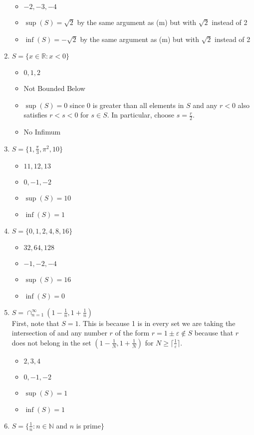 \documentclass[10pt,a4paper]{article}
\theoremstyle{definition}
\begin{document}
\begin{enumerate}[label = (\alph*)]
\begin{itemize}
\item $-2, -3, -4$
\item $\sup(S) = \sqrt{2}$ by the same argument as (m) but with $\sqrt{2}$ instead of 2
\item $\inf(S) = -\sqrt{2}$ by the same argument as (m) but with $\sqrt{2}$ instead of 2
\end{itemize}
\item $S = \{x \in \mathbb{R} : x < 0\}$
\begin{itemize}
\item $0, 1, 2$
\item Not Bounded Below
\item $\sup(S) = 0$ since 0 is greater than all elements in $S$ and any $r < 0$ also satisfies $r < s < 0$ for $s \in S$. In particular, choose $s = \frac{r}{2}$.
\item No Infimum
\end{itemize}
\item $S = \{1, \frac{\pi}{3}, \pi^2, 10\}$
\begin{itemize}
\item $11, 12, 13$
\item $0, -1, -2$
\item $\sup(S) = 10$
\item $\inf(S) = 1$
\end{itemize}
\item $S = \{0, 1, 2, 4, 8, 16\}$
\begin{itemize}
\item $32, 64, 128$
\item $-1, -2, -4$
\item $\sup(S) = 16$
\item $\inf(S) = 0$
\end{itemize}
\item $S = \cap_{n = 1}^{\infty} (1 - \frac{1}{n}, 1 + \frac{1}{n})$
\\First, note that $S = {1}$. This is because 1 is in every set we are taking the intersection of and any number $r$ of the form $r = 1 \pm \varepsilon \not\in S$ because that $r$ does not belong in the set $(1 - \frac{1}{N}, 1 + \frac{1}{N})$ for $N \geq \lceil\frac{1}{\varepsilon}\rceil$.
\begin{itemize}
\item $2, 3, 4$
\item $0, -1, -2$
\item $\sup(S) = 1$
\item $\inf(S) = 1$
\end{itemize}
\item $S = \{\frac{1}{n} : n \in \mathbb{N}$ and $n$ is prime$\}$

\end{enumerate}
\end{document}

